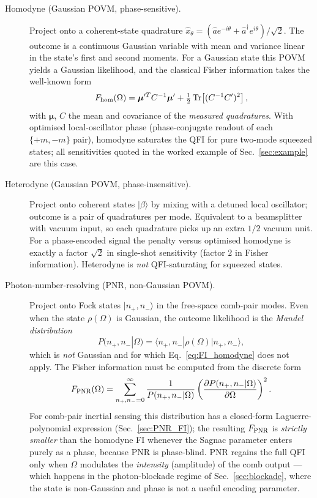\documentclass[11pt]{article}
\begin{document}
\begin{description}
\item[Homodyne (Gaussian POVM, phase-sensitive).]  Project onto a
  coherent-state quadrature $\hat x_\theta = (\hat a e^{-i\theta}
  + \hat a^\dag e^{i\theta})/\sqrt2$.  The outcome is a continuous
  Gaussian variable with mean and variance linear in the state's
  first and second moments.  For a Gaussian state this POVM yields a
  Gaussian likelihood, and the classical Fisher information takes the
  well-known form
  \begin{equation}
    F_{\rm hom}(\Omega)
    = \boldsymbol{\mu}'^T C^{-1}\boldsymbol{\mu}'
    + \tfrac12\,\mathrm{Tr}\!\left[(C^{-1}C')^2\right],
    \label{eq:FI_homodyne}
  \end{equation}
  with $\boldsymbol{\mu}$, $C$ the mean and covariance of the
  \emph{measured quadratures}.  With optimised local-oscillator phase
  (phase-conjugate readout of each $\{+m,-m\}$ pair), homodyne
  saturates the QFI for pure two-mode squeezed states; all
  sensitivities quoted in the worked example of
  Sec.~\ref{sec:example} are this case.

\item[Heterodyne (Gaussian POVM, phase-insensitive).]  Project onto
  coherent states $|\beta\rangle$ by mixing with a detuned
  local oscillator; outcome is a pair of quadratures per mode.
  Equivalent to a beamsplitter with vacuum input, so each quadrature
  picks up an extra $1/2$ vacuum unit.  For a phase-encoded signal
  the penalty versus optimised homodyne is exactly a factor $\sqrt2$
  in single-shot sensitivity (factor $2$ in Fisher information).
  Heterodyne is \emph{not} QFI-saturating for squeezed states.

\item[Photon-number-resolving (PNR, non-Gaussian POVM).]  Project onto
  Fock states $|n_+,n_-\rangle$ in the free-space comb-pair modes.
  Even when the state $\rho(\Omega)$ is Gaussian, the outcome likelihood
  is the \emph{Mandel distribution}
  \begin{equation}
    P(n_+,n_-|\Omega)
    = \langle n_+,n_-|\rho(\Omega)|n_+,n_-\rangle,
    \label{eq:Mandel}
  \end{equation}
  which is \emph{not} Gaussian and for which
  Eq.~\eqref{eq:FI_homodyne} does not apply.  The Fisher information
  must be computed from the discrete form
  \begin{equation}
    F_{\rm PNR}(\Omega)
    = \sum_{n_+,n_-=0}^\infty \frac{1}{P(n_+,n_-|\Omega)}
      \left(\frac{\partial P(n_+,n_-|\Omega)}{\partial\Omega}\right)^2.
    \label{eq:FI_PNR_generic}
  \end{equation}
  For comb-pair inertial sensing this distribution has a closed-form
  Laguerre-polynomial expression (Sec.~\ref{sec:PNR_FI}); the
  resulting $F_{\rm PNR}$ is \emph{strictly smaller} than the homodyne
  FI whenever the Sagnac parameter enters purely as a phase, because
  PNR is phase-blind.  PNR regains the full QFI only when $\Omega$
  modulates the \emph{intensity} (amplitude) of the comb output
  --- which happens in the photon-blockade regime of
  Sec.~\ref{sec:blockade}, where the state is non-Gaussian and phase
  is not a useful encoding parameter.
\end{description}
\end{document}
